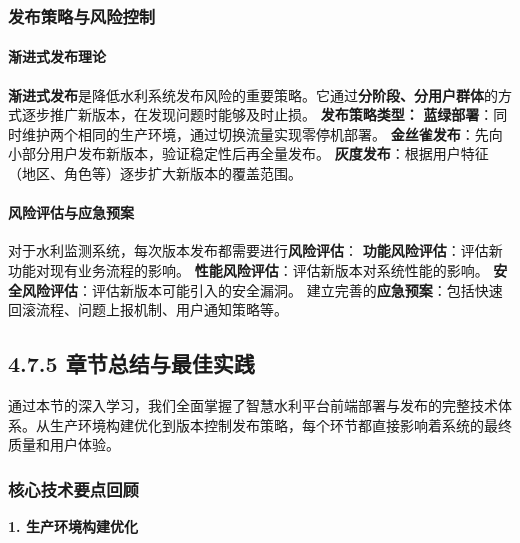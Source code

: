 \subsubsection{发布策略与风险控制}\label{ux53d1ux5e03ux7b56ux7565ux4e0eux98ceux9669ux63a7ux5236} \paragraph{渐进式发布理论}\label{ux6e10ux8fdbux5f0fux53d1ux5e03ux7406ux8bba} \textbf{渐进式发布}是降低水利系统发布风险的重要策略。它通过\textbf{分阶段、分用户群体}的方式逐步推广新版本，在发现问题时能够及时止损。 \textbf{发布策略类型：} \textbf{蓝绿部署}：同时维护两个相同的生产环境，通过切换流量实现零停机部署。 \textbf{金丝雀发布}：先向小部分用户发布新版本，验证稳定性后再全量发布。 \textbf{灰度发布}：根据用户特征（地区、角色等）逐步扩大新版本的覆盖范围。 \paragraph{风险评估与应急预案}\label{ux98ceux9669ux8bc4ux4f30ux4e0eux5e94ux6025ux9884ux6848} 对于水利监测系统，每次版本发布都需要进行\textbf{风险评估}： \textbf{功能风险评估}：评估新功能对现有业务流程的影响。 \textbf{性能风险评估}：评估新版本对系统性能的影响。 \textbf{安全风险评估}：评估新版本可能引入的安全漏洞。 建立完善的\textbf{应急预案}：包括快速回滚流程、问题上报机制、用户通知策略等。 \subsection{4.7.5 章节总结与最佳实践}\label{ux7ae0ux8282ux603bux7ed3ux4e0eux6700ux4f73ux5b9eux8df5} 通过本节的深入学习，我们全面掌握了智慧水利平台前端部署与发布的完整技术体系。从生产环境构建优化到版本控制发布策略，每个环节都直接影响着系统的最终质量和用户体验。 \subsubsection{核心技术要点回顾}\label{ux6838ux5fc3ux6280ux672fux8981ux70b9ux56deux987e} \textbf{1. 生产环境构建优化} 